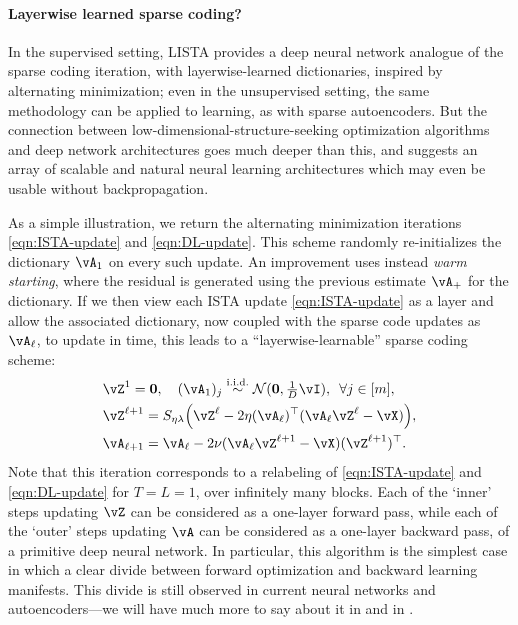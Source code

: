 \documentclass[../../book-main.tex]{subfiles}
\begin{document}
\paragraph{Layerwise learned sparse coding?}



In the supervised setting, LISTA provides a deep neural network analogue of
the sparse coding iteration, with layerwise-learned dictionaries, inspired by
alternating minimization; even in the unsupervised setting, the same methodology
can be applied to learning, as with sparse autoencoders.
But the connection between low-dimensional-structure-seeking optimization algorithms 
and deep network architectures goes much deeper than this, and suggests an array
of scalable and natural neural learning architectures which may even be usable
without backpropagation.

As a simple illustration, we return the alternating minimization iterations
\eqref{eqn:ISTA-update} and \eqref{eqn:DL-update}.
This scheme randomly re-initializes the dictionary $\vA_1$ on every such update.
An improvement uses instead \textit{warm starting}, where the residual is
generated using the previous estimate $\vA_+$ for the dictionary.
If we then view each ISTA update \eqref{eqn:ISTA-update} as a layer and allow
the associated dictionary, now coupled with the sparse code updates as
$\vA_\ell$, to update in time, this leads to a  ``layerwise-learnable'' sparse
coding scheme:
\begin{align}
    & \vZ^{1}
     = \Zero, \quad (\vA_{1})_j
     \simiid \dNorm(\vzero, \tfrac{1}{D}\vI), \enspace \forall j \in [m], \\ 
    & \vZ^{\ell + 1} = S_{\eta\lambda}\rp{\vZ^{\ell}
    - 2\eta(\vA_{\ell})^\top(\vA_{\ell}\vZ^{\ell}
    - \vX)},\label{eq:ISTA-update-layerwise}\\ 
    & \vA_{\ell + 1} = \vA_{\ell}- 2\nu (\vA_{\ell}\vZ^{\ell + 1}
    - \vX)(\vZ^{\ell + 1})^\top.
\end{align}
Note that this iteration %
corresponds to a relabeling of \eqref{eqn:ISTA-update} and \eqref{eqn:DL-update}
for $T = L = 1$, over infinitely many blocks.
Each of the `inner' steps updating $\vZ$ can be considered as a one-layer
forward pass, while each of the `outer' steps updating $\vA$ can be considered
as a one-layer  backward pass, of a primitive deep neural network. In
particular, this algorithm is the simplest case in which a clear divide between
forward optimization and backward learning manifests. This divide is still
observed in current neural networks and autoencoders---we will have much more to say about it in  and in
. 
\end{document}
